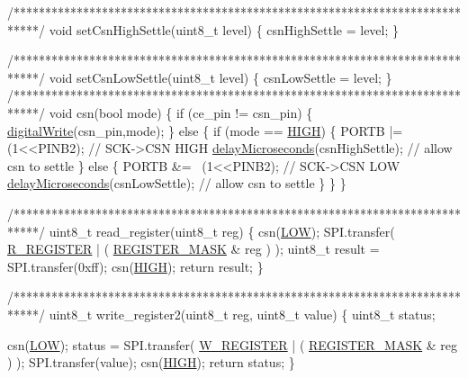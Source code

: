 \begin{DoxyCodeInclude}
\textcolor{comment}{/****************************************************************************/}
\textcolor{keywordtype}{void} setCsnHighSettle(uint8\_t level) \{
  csnHighSettle = level;
\}

\textcolor{comment}{/****************************************************************************/}
\textcolor{keywordtype}{void} setCsnLowSettle(uint8\_t level) \{
  csnLowSettle = level;
\}
\textcolor{comment}{/****************************************************************************/}
\textcolor{keywordtype}{void} csn(\textcolor{keywordtype}{bool} mode) \{
    \textcolor{keywordflow}{if} (ce\_pin != csn\_pin) \{
        \hyperlink{group__Porting__General_gabda89b115581947337690b2f85bfab6e}{digitalWrite}(csn\_pin,mode);
    \} \textcolor{keywordflow}{else} \{
        \textcolor{keywordflow}{if} (mode == \hyperlink{group__Porting__General_ga5bb885982ff66a2e0a0a45a8ee9c35e2}{HIGH}) \{
            PORTB |= (1<<PINB2);    \textcolor{comment}{// SCK->CSN HIGH}
            \hyperlink{group__Porting__General_ga9384257bf5d5c1aae675b22cc3ecb91a}{delayMicroseconds}(csnHighSettle);  \textcolor{comment}{// allow csn to settle}
        \} \textcolor{keywordflow}{else} \{
            PORTB &= ~(1<<PINB2);   \textcolor{comment}{// SCK->CSN LOW}
            \hyperlink{group__Porting__General_ga9384257bf5d5c1aae675b22cc3ecb91a}{delayMicroseconds}(csnLowSettle);  \textcolor{comment}{// allow csn to settle}
        \}
    \}   
\}

\textcolor{comment}{/****************************************************************************/}
uint8\_t read\_register(uint8\_t reg)
\{
  csn(\hyperlink{group__Porting__General_gab811d8c6ff3a505312d3276590444289}{LOW});
  SPI.transfer( \hyperlink{nRF24L01_8h_afb0b251378d3b14c508e51fd2c3157d6}{R\_REGISTER} | ( \hyperlink{nRF24L01_8h_a866fc0cef05f3c63ba55a555f63648a2}{REGISTER\_MASK} & reg ) );
  uint8\_t result = SPI.transfer(0xff);
  csn(\hyperlink{group__Porting__General_ga5bb885982ff66a2e0a0a45a8ee9c35e2}{HIGH});
  \textcolor{keywordflow}{return} result;
\}

\textcolor{comment}{/****************************************************************************/}
uint8\_t write\_register2(uint8\_t reg, uint8\_t value)
\{
  uint8\_t status;

  csn(\hyperlink{group__Porting__General_gab811d8c6ff3a505312d3276590444289}{LOW});
  status = SPI.transfer( \hyperlink{nRF24L01_8h_a3b68b214d5753039d2c156ad57cd7153}{W\_REGISTER} | ( \hyperlink{nRF24L01_8h_a866fc0cef05f3c63ba55a555f63648a2}{REGISTER\_MASK} & reg ) );
  SPI.transfer(value);
  csn(\hyperlink{group__Porting__General_ga5bb885982ff66a2e0a0a45a8ee9c35e2}{HIGH});
  \textcolor{keywordflow}{return} status;
\}


\end{DoxyCodeInclude}
